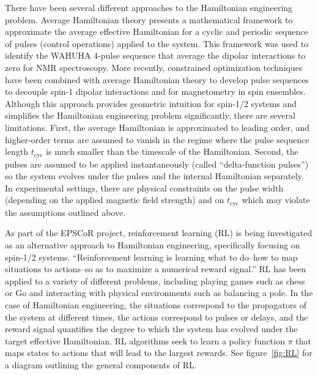 \documentclass{article}
\begin{document}
There have been several different approaches to the Hamiltonian engineering problem.
Average Hamiltonian theory\cite{PhysRev.175.453} presents a mathematical framework to approximate the average effective Hamiltonian for a cyclic and periodic sequence of pulses (control operations) applied to the system.
This framework was used to identify the WAHUHA 4-pulse sequence\cite{PhysRevLett.20.180} that average the dipolar interactions to zero for NMR spectroscopy. More recently, constrained optimization techniques have been combined with average Hamiltonian theory to develop pulse sequences to decouple spin-1 dipolar interactions\cite{PhysRevLett.119.183603} and for magnetometry in spin ensembles\cite{O_Keeffe_2019}.
Although this approach provides geometric intuition for spin-1/2 systems and simplifies the Hamiltonian engineering problem significantly, there are several limitations. First, the average Hamiltonian is approximated to leading order, and higher-order terms are assumed to vanish in the regime where the pulse sequence length $t_\text{cyc}$ is much smaller than the timescale of the Hamiltonian. Second, the pulses are assumed to be applied instantaneously (called ``delta-function pulses'') so the system evolves under the pulses and the internal Hamiltonian separately.
In experimental settings, there are physical constraints on the pulse width (depending on the applied magnetic field strength) and on $t_\text{cyc}$ which may violate the assumptions outlined above.


As part of the EPSCoR project, reinforcement learning (RL) is being investigated as an alternative approach to Hamiltonian engineering, specifically focusing on spin-1/2 systems.
``Reinforcement learning is learning what to do--how to map situations to actions--so as to maximize a numerical reward signal.''\cite{sutton2018reinforcement} RL has been applied to a variety of different problems, including playing games such as chess or Go\cite{Silver1140} and interacting with physical environments such as balancing a pole\cite{lillicrap2015continuous}. In the case of Hamiltonian engineering, the situations correspond to the propagators of the system at different times, the actions correspond to pulses or delays, and the reward signal quantifies the degree to which the system has evolved under the target effective Hamiltonian.
RL algorithms seek to learn a policy function $\pi$ that maps states to actions that will lead to the largest rewards. See figure~\ref{fig:RL} for a diagram outlining the general components of RL.
\end{document}
